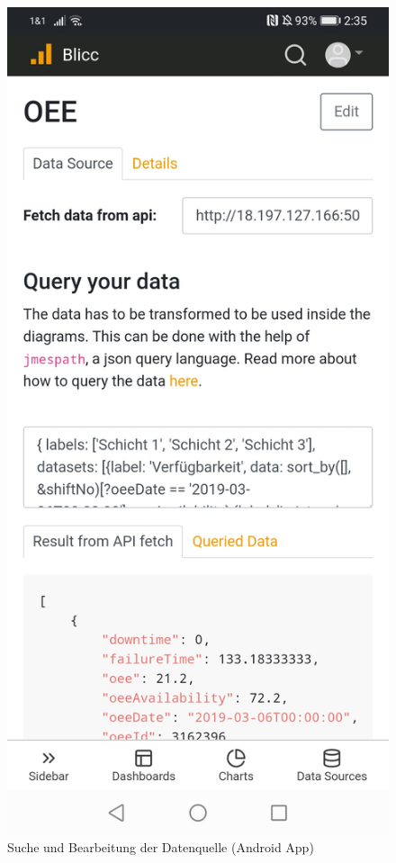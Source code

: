 \begin{figure}[h]
    \includegraphics[scale=0.1]{img/android/DataSource}
    \caption{Suche und Bearbeitung der Datenquelle (Android App)}
    \label{figure:sucheundbearbeitungderdatenquelle}
\end{figure}


